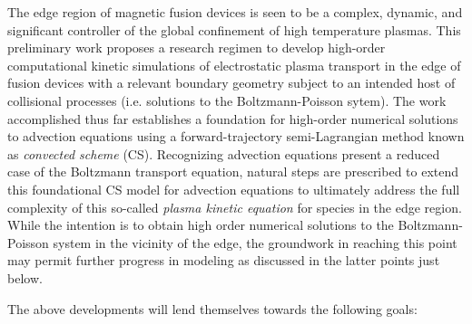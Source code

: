 \documentclass[11pt,titlepage]{report}
\begin{document}
\indent The edge region of magnetic fusion devices is seen to be a complex, dynamic, and significant controller of the global confinement of high temperature plasmas. This preliminary work proposes a research regimen to develop high-order computational kinetic simulations of electrostatic plasma transport in the edge of fusion devices with a relevant boundary geometry subject to an intended host of collisional processes (i.e. solutions to the Boltzmann-Poisson sytem). The work accomplished thus far establishes a foundation for high-order numerical solutions to advection equations using a forward-trajectory semi-Lagrangian method known as \emph{convected scheme} (CS). Recognizing advection equations present a reduced case of the Boltzmann transport equation, natural steps are prescribed to extend this foundational CS model for advection equations to ultimately address the full complexity of this so-called \emph{plasma kinetic equation} for species in the edge region. While the intention is to obtain high order numerical solutions to the Boltzmann-Poisson system in the vicinity of the edge, the groundwork in reaching this point may permit further progress in modeling as discussed in the latter points just below.

The above developments will lend themselves towards the following goals:
\end{document}
